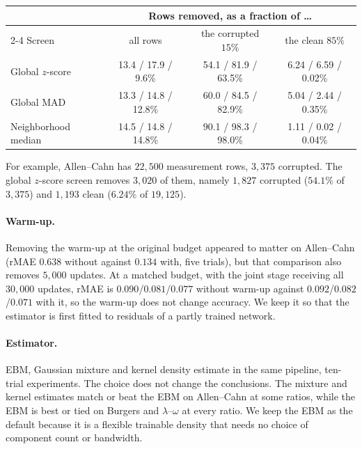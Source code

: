 \documentclass[twoside]{article}
\begin{document}
\begin{center}\small
\begin{tabular}{lccc}
\toprule
 & \multicolumn{3}{c}{Rows removed, as a fraction of \dots} \\
\cmidrule(lr){2-4}
Screen & all rows & the corrupted $15\%$ & the clean $85\%$ \\
\midrule
Global $z$-score     & 13.4 / 17.9 / 9.6\% & 54.1 / 81.9 / 63.5\% & 6.24 / 6.59 / 0.02\% \\
Global MAD           & 13.3 / 14.8 / 12.8\% & 60.0 / 84.5 / 82.9\% & 5.04 / 2.44 / 0.35\% \\
Neighborhood median  & 14.5 / 14.8 / 14.8\% & 90.1 / 98.3 / 98.0\% & 1.11 / 0.02 / 0.04\% \\
\bottomrule
\end{tabular}
\end{center}

\noindent
For example, Allen--Cahn has $22{,}500$ measurement rows, $3{,}375$ corrupted.
The global $z$-score screen removes $3{,}020$ of them, namely $1{,}827$ corrupted
($54.1\%$ of $3{,}375$) and $1{,}193$ clean ($6.24\%$ of $19{,}125$).

\paragraph{Warm-up.}
Removing the warm-up at the original budget appeared to matter on Allen--Cahn
(rMAE $0.638$ without against $0.134$ with, five trials), but that comparison also
removes $5{,}000$ updates. At a matched budget, with the joint stage receiving all
$30{,}000$ updates, rMAE is $0.090$/$0.081$/$0.077$ without warm-up against
$0.092$/$0.082$/$0.071$ with it, so the warm-up does not change accuracy. We keep
it so that the estimator is first fitted to residuals of a
partly trained network.

\paragraph{Estimator.}
EBM, Gaussian mixture and kernel density estimate in the same pipeline,
ten-trial experiments. The choice does not change the conclusions. The mixture and
kernel estimates match or beat the EBM on Allen--Cahn at some ratios, while the
EBM is best or tied on Burgers and $\lambda$--$\omega$ at every ratio. We keep the EBM as
the default because it is a flexible trainable density that needs no choice of
component count or bandwidth.
\end{document}
